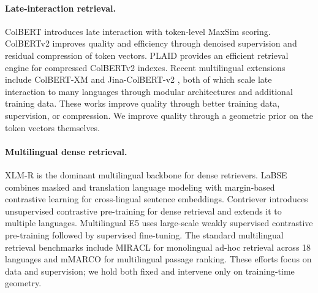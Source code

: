 \paragraph{Late-interaction retrieval.} ColBERT \citep{khattab2020colbert} introduces late interaction with token-level MaxSim scoring. ColBERTv2 \citep{santhanam2022colbertv2} improves quality and efficiency through denoised supervision and residual compression of token vectors. PLAID \citep{santhanam2022plaid} provides an efficient retrieval engine for compressed ColBERTv2 indexes. Recent multilingual extensions include ColBERT-XM \citep{louis2024colbertxm} and Jina-ColBERT-v2 \citep{jha2024jinacolbert}, both of which scale late interaction to many languages through modular architectures and additional training data. These works improve quality through better training data, supervision, or compression. We improve quality through a geometric prior on the token vectors themselves.

\paragraph{Multilingual dense retrieval.} XLM-R \citep{conneau2020xlmr} is the dominant multilingual backbone for dense retrievers. LaBSE \citep{feng2022labse} combines masked and translation language modeling with margin-based contrastive learning for cross-lingual sentence embeddings. Contriever \citep{izacard2022contriever} introduces unsupervised contrastive pre-training for dense retrieval and extends it to multiple languages. Multilingual E5 \citep{wang2024me5} uses large-scale weakly supervised contrastive pre-training followed by supervised fine-tuning. The standard multilingual retrieval benchmarks include MIRACL \citep{zhang2023miracl} for monolingual ad-hoc retrieval across 18 languages and mMARCO \citep{bonifacio2021mmarco} for multilingual passage ranking. These efforts focus on data and supervision; we hold both fixed and intervene only on training-time geometry.

